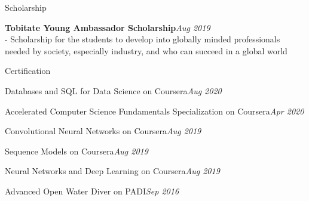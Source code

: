 \documentclass{resume} %
\begin{document}
\begin{rSection}{Scholarship}
 \item {\bf Tobitate Young Ambassador Scholarship}\hfill {\em Aug 2019}\\- Scholarship for the students to develop into globally minded professionals needed by society, especially industry, and who can succeed in a global world

\end{rSection}

\begin{rSection}{Certification}
 \item Databases and SQL for Data Science on Coursera\hfill {\em Aug 2020}
\item Accelerated Computer Science Fundamentals Specialization on Coursera\hfill {\em Apr 2020}
\item Convolutional Neural Networks on Coursera\hfill {\em Aug 2019}
\item Sequence Models on Coursera\hfill {\em Aug 2019}
\item Neural Networks and Deep Learning on Coursera\hfill{\em Aug 2019}
\item Advanced Open Water Diver on PADI\hfill{\em Sep 2016}
\end{rSection}
\end{document}
